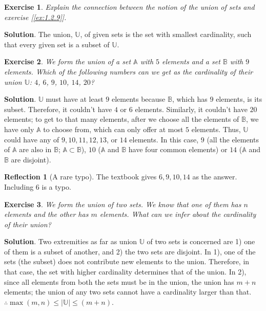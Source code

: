 \documentclass[11pt]{book}
\theoremstyle{definition}
\theoremstyle{plain}
\newtheorem{exercise}{Exercise}
\theoremstyle{definition}
\theoremstyle{problemstyle}
\theoremstyle{remark}
\theoremstyle{definition}
\newtheorem{reflection}{Reflection}
\begin{document}
\begin{exercise}
    Explain the connection between the notion of the union of sets and exercise [\ref{ex:1.2.9}].
    \label{ex:1.2.11}
\end{exercise}
\textbf{Solution}. 
The union, $\mathbb{U}$, of given sets is the set with smallest cardinality, such that every given set is a subset of $\mathbb{U}$. 
\begin{exercise}
    We form the union of a set $\mathbb{A}$ with $5$ elements and a set $\mathbb{B}$ with $9$ elements.  Which of the following numbers can we get as the cardinality of their union $\mathbb{U}$: $4$, $6$, $9$, $10$, $14$, $20$?
    \label{ex:1.2.12}
\end{exercise}
\textbf{Solution}. 
$\mathbb{U}$ must have at least $9$ elements because $\mathbb{B}$, which has $9$ elements, is its subset. Therefore, it couldn't have $4$ or $6$ elements. Similarly, it couldn't have $20$ elements; to get to that many elements, after we choose all the elements of $\mathbb{B}$, we have only $\mathbb{A}$ to choose from, which can only offer at most $5$ elements. Thus, $\mathbb{U}$ could have any of $9,10,11,12,13$, or $14$ elements. In this case, $9$ (all the elements of $\mathbb{A}$ are also in $\mathbb{B}$; $\mathbb{A}\subset\mathbb{B}$), $10$ ($\mathbb{A}$ and $\mathbb{B}$ have four common elements) or $14$ ($\mathbb{A}$ and $\mathbb{B}$ are disjoint).
\begin{reflection}[A rare typo]
    The textbook gives $6,9,10,14$ as the answer. Including $6$ is a typo.
\end{reflection}
\begin{exercise}
    We form the union of two sets. We know that one of them has $n$ elements and the other has $m$ elements. What can we infer about the cardinality of their union?
    \label{ex:1.2.13}
\end{exercise}
\textbf{Solution}.
Two extremities as far as union $\mathbb{U}$ of two sets is concerned are 1) one of them is a subset of another, and 2) the two sets are disjoint. In 1), one of the sets (the subset) does not contribute new elements to the union. Therefore, in that case, the set with higher cardinality determines that of the union. In 2), since all elements from both the sets must be in the union, the union has $m+n$ elements; the union of any two sets cannot have a cardinality larger than that. $\therefore\max(m,n)\leq\lvert\mathbb{U}\rvert\leq(m+n)$.
\end{document}
